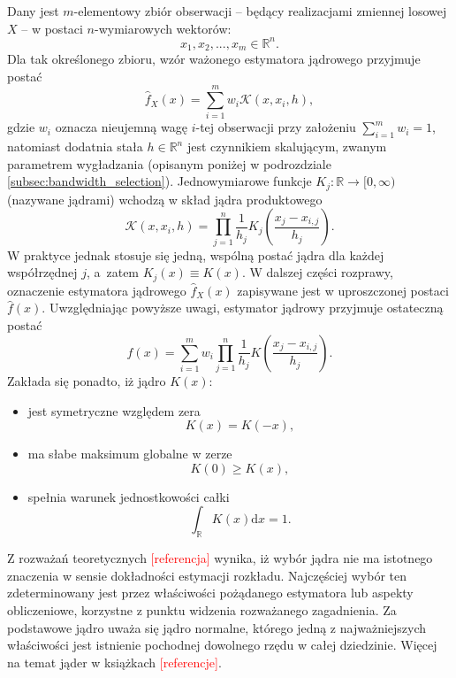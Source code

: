 \documentclass[12pt,a4paper,oneside]{book}
\theoremstyle{definition}
\begin{document}
Dany jest $m$-elementowy zbiór obserwacji -- będący realizacjami zmiennej losowej $X$ -- w postaci $n$-wymiarowych wektorów:
\begin{equation} \label{eq:kde_dataset}
x_1, x_2, ..., x_m \in \mathbb{R}^n.
\end{equation}
Dla tak określonego zbioru, wzór ważonego estymatora jądrowego przyjmuje postać
\begin{equation} \label{eq:kde1}
\hat{f}_X(x) = \sum_{i=1}^m w_i \mathcal{K} (x,x_i,h),
\end{equation}
gdzie $w_i$ oznacza nieujemną wagę $i$-tej obserwacji przy założeniu $\sum_{i=1}^m w_i=1$, natomiast dodatnia stała $h \in \mathbb{R}^n$ jest czynnikiem skalującym, zwanym parametrem wygładzania (opisanym poniżej w podrozdziale \ref{subsec:bandwidth_selection}). Jednowymiarowe funkcje $K_j:\mathbb{R} \rightarrow [0,\infty)$  (nazywane jądrami) wchodzą w skład jądra produktowego
\begin{equation}\label{eq:product_kernel}
\mathcal{K}(x,x_i,h) = \prod_{j=1}^n \frac{1}{h_j} K_j \left( \frac{x_j-x_{i,j}}{h_j} \right).
\end{equation}
W praktyce jednak stosuje się jedną, wspólną postać jądra dla każdej współrzędnej $j$, a~zatem $K_j(x) \equiv K(x)$. W dalszej części rozprawy, oznaczenie estymatora jądrowego $\hat{f}_X(x)$ zapisywane jest w uproszczonej postaci $\hat{f}(x)$. Uwzględniając powyższe uwagi, estymator jądrowy przyjmuje ostateczną postać
\begin{equation} \label{eq:kde2}
\hat{f}(x) = \sum_{i=1}^m w_i \prod_{j=1}^n \frac{1}{h_j} K \left( \frac{x_j-x_{i,j}}{h_j} \right).
\end{equation}
Zakłada się ponadto, iż jądro $K(x)$:
\begin{itemize}
\item jest symetryczne względem zera
\begin{equation} \label{eq:kernel_cond1}
K(x) = K(-x),
\end{equation}
\item ma słabe maksimum globalne w zerze
\begin{equation} \label{eq:kernel_cond2}
K(0) \geq K(x),
\end{equation}
\item spełnia warunek jednostkowości całki
\begin{equation} \label{eq:kernel_cond3}
\int_\mathbb{R} K(x) \mathrm{d}x = 1.
\end{equation}
\end{itemize}
Z rozważań teoretycznych \textcolor{red}{[referencja]} wynika, iż wybór jądra nie ma istotnego znaczenia w sensie dokładności estymacji rozkładu. Najczęściej wybór ten zdeterminowany jest przez właściwości pożądanego estymatora lub aspekty obliczeniowe, korzystne z punktu widzenia rozważanego zagadnienia. Za podstawowe jądro uważa się jądro normalne, którego jedną z najważniejszych właściwości jest istnienie pochodnej dowolnego rzędu w całej dziedzinie. Więcej na temat jąder w książkach \textcolor{red}{[referencje]}.
\end{document}
